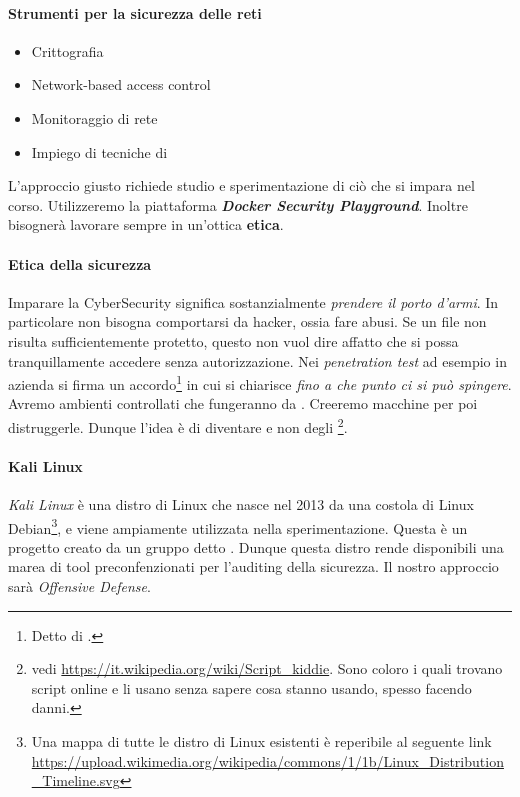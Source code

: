 \documentclass[14pt]{extreport}
\begin{document}
\paragraph{Strumenti per la sicurezza delle reti}
\begin{itemize}
    \item Crittografia
    \item Network-based access control
    \item Monitoraggio di rete
    \item Impiego di tecniche di 
\end{itemize}



L'approccio giusto richiede studio e sperimentazione di ciò che si impara nel corso. Utilizzeremo la piattaforma \textit{\textbf{Docker Security Playground}}. Inoltre bisognerà lavorare sempre in un'ottica \textbf{etica}.




\paragraph{Etica della sicurezza}
Imparare la CyberSecurity significa sostanzialmente \textit{prendere il porto d'armi}. In particolare non bisogna comportarsi da hacker, ossia fare abusi. Se un file non risulta sufficientemente protetto, questo non vuol dire affatto che si possa tranquillamente accedere senza autorizzazione. Nei \textit{penetration test} ad esempio in azienda si firma un accordo\footnote{Detto di .} in cui si chiarisce \textit{fino a che punto ci si può spingere}.
Avremo ambienti controllati che fungeranno da . Creeremo macchine per poi distruggerle.
Dunque l'idea è di diventare  e non degli \footnote{vedi \url{https://it.wikipedia.org/wiki/Script_kiddie}. Sono coloro i quali trovano script online e li usano senza sapere cosa stanno usando, spesso facendo danni.}.



\paragraph{Kali Linux}
\textit{Kali Linux} è una distro di Linux che nasce nel 2013 da una costola di Linux Debian\footnote{Una mappa di tutte le distro di Linux esistenti è reperibile al seguente link \url{https://upload.wikimedia.org/wikipedia/commons/1/1b/Linux_Distribution_Timeline.svg}}, e viene ampiamente utilizzata nella sperimentazione. Questa è un progetto creato da un gruppo detto . Dunque questa distro rende disponibili una marea di tool preconfenzionati per l'auditing della sicurezza. Il nostro approccio sarà \textit{Offensive Defense}.
\end{document}
